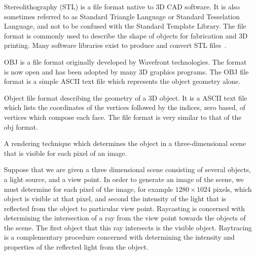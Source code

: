 

{%
Stereolithography (STL) is a file format native to 3D CAD software.
It is also sometimes referred to as Standard Triangle Language or Standard Tesselation Language, and not to be confused with the Standard Template Library.
The file format is commonly used to describe the shape of objects for fabrication and 3D printing.
Many software libraries exist to produce and convert STL files~\cite{botsch2002,cignoni2008,blenderfoundation1995--2017,libigl2017}.
}

{
    OBJ is a file format originally developed by Wavefront technologies.
    The format is now open and has been adopted by many 3D graphics programs.
    The OBJ file format is a simple ASCII text file which represents the object geometry alone.
}

{%
Object file format describing the geometry of a 3D object.
It is a ASCII text file which lists the coordinates of the vertices followed by the indices, zero based, of vertices which compose each face.
The file format is very similar to that of the \gls{obj} format.
}

{%
    A rendering technique which determines the object in a three-dimensional scene that is visible for each pixel of an image.

    Suppose that we are given a three dimensional scene consisting of several objects, a light source, and a view point.
    In order to generate an image of the scene, we must determine for each pixel of the image, for example \( 1280 \times 1024\) pixels, which object is visible at that pixel, and second the intensity of the light that is reflected from the object to particular view point.
    Raycasting is concerned with determining the intersection of a ray from the view point towards the objects of the scene.
    The first object that this ray intersects is the visible object.
    Raytracing is a complementary procedure concerned with determining the intensity and properties of the reflected light from the object.
}

